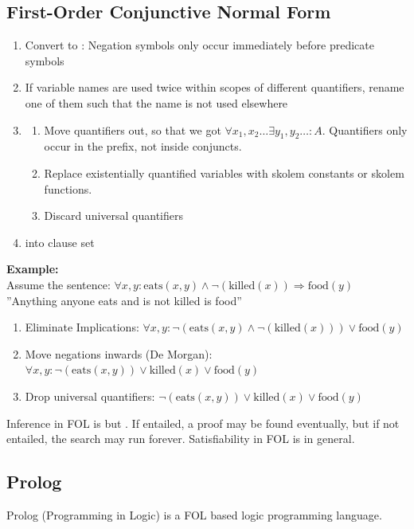 \documentclass[
../EiKI_Summary.tex,
]
{subfiles}
\begin{document}
\subsection{First-Order Conjunctive Normal Form}
\begin{enumerate}
    \item Convert to : Negation symbols only occur immediately before predicate symbols
    \item If variable names are used twice within scopes of different quantifiers, rename one of them such that the name is not used elsewhere
    \item {}
    \begin{enumerate}
        \item Move quantifiers out, so that we got $\forall x_1,x_2\dots \exists y_1,y_2\dots : A$. Quantifiers only occur in the prefix, not inside conjuncts.
        \item Replace existentially quantified variables with skolem constants or skolem functions.
        \item Discard universal quantifiers
    \end{enumerate}
    \item {} into clause set
\end{enumerate}

\textbf{Example:}\\
Assume the sentence: $\forall x,y: \text{eats}(x,y) \land \neg(\text{killed}(x)) \Rightarrow \text{food}(y)$ ''Anything anyone eats and is not killed is food''\\
\begin{enumerate}
    \item Eliminate Implications: $\forall x,y: \neg(\text{eats}(x,y) \land \neg(\text{killed}(x))) \lor \text{food}(y)$
    \item Move negations inwards (De Morgan): $\forall x,y: \neg(\text{eats}(x,y)) \lor \text{killed}(x) \lor \text{food}(y)$
    \item Drop universal quantifiers: $\neg(\text{eats}(x,y)) \lor \text{killed}(x) \lor \text{food}(y)$
\end{enumerate}

Inference in FOL is  but . If entailed, a proof may be found eventually, but if not entailed, the search may run forever. Satisfiability in FOL is  in general.

\subsection{Prolog}
Prolog (Programming in Logic) is a FOL based logic programming language.
\end{document}
